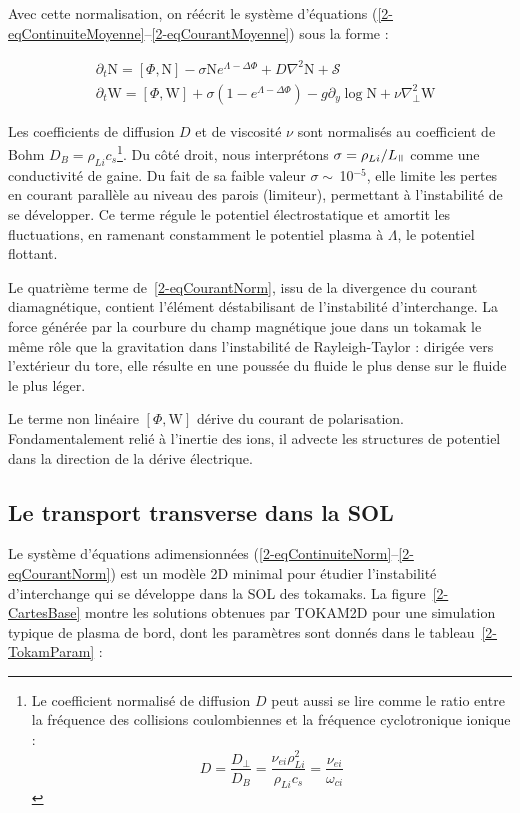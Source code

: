 \begin{refsection}
Avec cette normalisation, on
réécrit le système d'équations
(\eqref{2-eqContinuiteMoyenne}--\eqref{2-eqCourantMoyenne}) sous la forme :

\begin{align}
\label{2-eqContinuiteNorm}
&\partial_t \text{N}
= \left[\Phi,\text{N}\right] -\sigma \text{N}e^{\Lambda-\Delta\Phi}
 + D\nabla^2 \text{N} + \mathcal{S}
\\
\label{2-eqCourantNorm}
&\partial_{t}\text{W} = 
\left[\Phi,\text{W}\right]
+\sigma\left(1-e^{\Lambda-\Delta\Phi}\right) 
-g\partial_y\log\text{N}
+\nu\nabla_\perp^2\text{W}
\end{align}
 
Les coefficients de diffusion $D$ et de viscosité $\nu$ sont normalisés au
coefficient de Bohm $D_B=\rho_{Li}c_s$\footnote{Le coefficient normalisé de
diffusion $D$ peut aussi se lire comme le ratio entre la fréquence des
collisions coulombiennes et la fréquence cyclotronique ionique :
$$D=\frac{D_\perp}{D_B}=\frac{\nu_{ei}\rho_{Li}^2}{\rho_{Li}c_s}=\frac{\nu_{ei}}{\omega_{ci}}$$
}.
Du côté droit, nous interprétons $\sigma=\rho_{Li}/L_\para$ comme une
conductivité de gaine. Du fait de sa faible valeur $\sigma\sim\,$10$^{-5}$, elle
limite les pertes en courant parallèle au niveau des parois (limiteur),
permettant à l'instabilité de se développer. Ce terme régule le potentiel
électrostatique et amortit les fluctuations, en ramenant constamment le
potentiel plasma à $\Lambda$, le potentiel flottant.

Le quatrième terme de~\eqref{2-eqCourantNorm}, issu de la divergence
du courant diamagnétique, contient l'élément déstabilisant de
 l'instabilité d'interchange. La force générée par la courbure du champ
 magnétique joue dans un tokamak le même rôle que la gravitation dans
 l'instabilité de Rayleigh-Taylor : dirigée vers l'extérieur du tore, elle 
 résulte en une poussée du fluide le plus dense sur le fluide le plus léger. 
 
 Le terme non linéaire $[\Phi,\text{W}]$ dérive du courant de polarisation.
 Fondamentalement relié à l'inertie des ions, il advecte les structures de
 potentiel dans la direction de la dérive électrique.
 

\subsection{Le transport transverse dans la SOL}

Le système d'équations
adimensionnées (\eqref{2-eqContinuiteNorm}--\eqref{2-eqCourantNorm}) est un
modèle 2D minimal pour étudier l'instabilité d'interchange qui se développe dans
la SOL des tokamaks. La figure~\ref{2-CartesBase} montre les solutions obtenues
par TOKAM2D pour une simulation typique de plasma de bord, dont les paramètres
sont donnés dans le tableau~\ref{2-TokamParam} :


\end{refsection}
